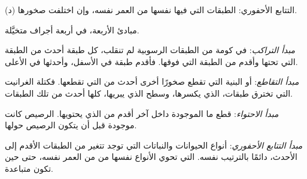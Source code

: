 \begin{omfigure}
\begin{minipage}[t]{0.49\linewidth}
{\small (د) التتابع الأحفوري: الطبقات التي فيها  نفسها من العمر
نفسه، وإن اختلفت صخورها.}
\end{minipage}

\medskip
{\small مبادئ  الأربعة، في أربعة أجراف
متخيَّلة.}
\label{fig:g7:geological-time:principles}
\end{omfigure}

\begin{definition}\label{def:g7:geological-time:superposition}
\emph{مبدأ التراكب}: في كومة من الطبقات الرسوبية لم
تنقلب، كل طبقة أحدث من الطبقة التي تحتها وأقدم من الطبقة التي فوقها.
فأقدم طبقة في الأسفل، وأحدثها في الأعلى.
\end{definition}

\begin{definition}\label{def:g7:geological-time:cross-cutting}
\emph{مبدأ التقاطع}:  أو البنية التي تقطع صخورًا
أخرى أحدث من  التي تقطعها. فكتلة الغرانيت التي تخترق طبقات، 
الذي يكسرها، وسطح  الذي يبريها، كلها أحدث من تلك الطبقات.
\end{definition}

\begin{definition}\label{def:g7:geological-time:inclusion}
\emph{مبدأ الاحتواء}: قطع  ما الموجودة داخل 
آخر أقدم من  الذي يحتويها.  الرصيص كانت موجودة قبل أن يتكون
الرصيص حولها.
\end{definition}

\begin{definition}\label{def:g7:geological-time:fossil-succession}
\emph{مبدأ التتابع الأحفوري}: أنواع الحيوانات
والنباتات التي توجد  تتغير من الطبقات الأقدم إلى الأحدث، دائمًا
بالترتيب نفسه.  التي تحوي الأنواع نفسها من  من العمر نفسه،
حتى حين تكون متباعدة.
\end{definition}


